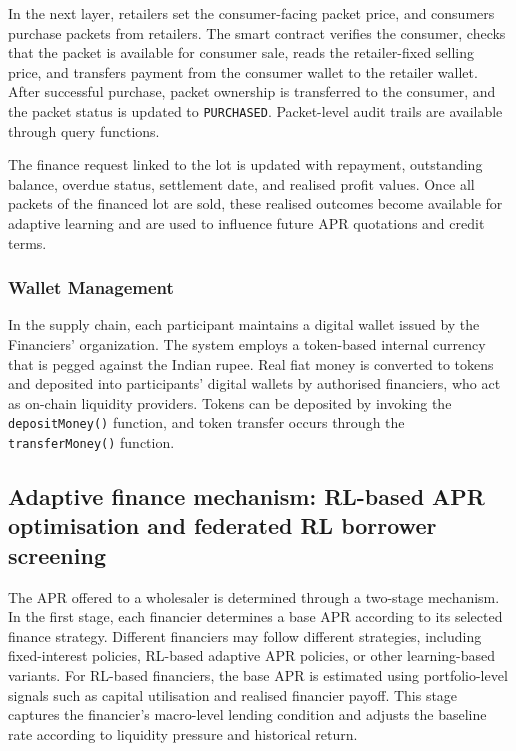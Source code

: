 \documentclass[12pt]{article}
\begin{document}
In the next layer, retailers set the consumer-facing packet price, and consumers purchase packets from retailers. The smart contract verifies the consumer, checks that the packet is available for consumer sale, reads the retailer-fixed selling price, and transfers payment from the consumer wallet to the retailer wallet. After successful purchase, packet ownership is transferred to the consumer, and the packet status is updated to \texttt{PURCHASED}. Packet-level audit trails are available through query functions.
	
	The finance request linked to the lot is updated with repayment, outstanding balance, overdue status, settlement date, and realised profit values. Once all packets of the financed lot are sold, these realised outcomes become available for adaptive learning and are used to influence future APR quotations and credit terms.
	
	
	
	
	\subsubsection{Wallet Management}
	
	In the supply chain, each participant maintains a digital wallet issued by the Financiers' organization. The system employs a token-based internal currency that is pegged against the Indian rupee. Real fiat money is converted to tokens and deposited into participants' digital wallets by authorised financiers, who act as on-chain liquidity providers. Tokens can be deposited by invoking the \texttt{depositMoney()} function, and token transfer occurs through the \texttt{transferMoney()} function.
	

	\subsection{Adaptive finance mechanism: RL-based APR optimisation and federated RL borrower screening}
	
	The APR offered to a wholesaler is determined through a two-stage mechanism. In the first stage, each financier determines a base APR according to its selected finance strategy. Different financiers may follow different strategies, including fixed-interest policies, RL-based adaptive APR policies, or other learning-based variants. For RL-based financiers, the base APR is estimated using portfolio-level signals such as capital utilisation and realised financier payoff. This stage captures the financier's macro-level lending condition and adjusts the baseline rate according to liquidity pressure and historical return.
	
\end{document}
